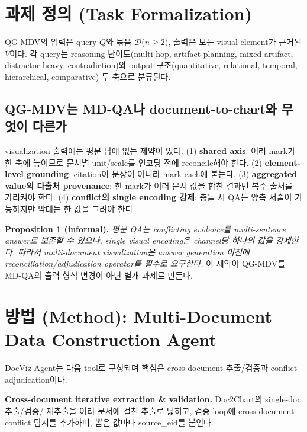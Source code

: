 \documentclass[11pt]{article}
\begin{document}
\section{과제 정의 (Task Formalization)}
QG-MDV의 입력은 query $Q$와 묶음 $\mathcal{D}$($n\geq2$), 출력은 모든 visual element가 근거된
$V$이다. 각 query는 reasoning 난이도(multi-hop, artifact planning, mixed artifact,
distractor-heavy, contradiction)와 output 구조(quantitative, relational, temporal, hierarchical,
comparative) 두 축으로 분류된다.

\subsection{QG-MDV는 MD-QA나 document-to-chart와 무엇이 다른가}
\label{sec:diff}
visualization 출력에는 평문 답에 없는 제약이 있다. (1) \textbf{shared axis}: 여러 mark가 한 축에
놓이므로 문서별 unit/scale를 인코딩 전에 reconcile해야 한다. (2) \textbf{element-level grounding}:
citation이 문장이 아니라 mark each에 붙는다. (3) \textbf{aggregated value의 다출처 provenance}:
한 mark가 여러 문서 값을 합친 결과면 복수 출처를 가리켜야 한다. (4) \textbf{conflict의 single
encoding 강제}: 충돌 시 QA는 양측 서술이 가능하지만 막대는 한 값을 그려야 한다.

\noindent\textbf{Proposition 1 (informal).} \emph{평문 QA는 conflicting evidence를 multi-sentence
answer로 보존할 수 있으나, single visual encoding은 channel당 하나의 값을 강제한다. 따라서
multi-document visualization은 answer generation 이전에 reconciliation/adjudication operator를
필수로 요구한다.} 이 제약이 QG-MDV를 MD-QA의 출력 형식 변경이 아닌 별개 과제로 만든다.

\section{방법 (Method): Multi-Document Data Construction Agent}
\label{sec:method}
DocViz-Agent는 다음 tool로 구성되며 핵심은 cross-document 추출/검증과 conflict adjudication이다.

\textbf{Cross-document iterative extraction \& validation.} Doc2Chart의 single-doc 추출/검증/
재추출을 여러 문서에 걸친 추출로 넓히고, 검증 loop에 cross-document conflict 탐지를 추가하며, 뽑은
값마다 source\_eid를 붙인다.
\end{document}
